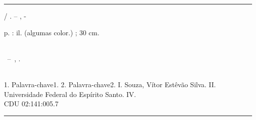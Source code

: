 \documentclass[
	12pt,				%
	openright,			%
	oneside,			%
	a4paper,			%
	english,			%
	french,				%
	spanish,			%
	brazil				%
	]{abntex2}
\begin{document}
\begin{fichacatalografica}
	\vspace*{\fill}
	\hrule
	\begin{center}
	\begin{minipage}[c]{12.5cm}
	
	\imprimirautor
	
	\hspace{0.5cm} \imprimirtitulo  / \imprimirautor. --
	\imprimirlocal, \imprimirdata-
	
	\hspace{0.5cm} \pageref{LastPage} p. : il. (algumas color.) ; 30 cm.\\
	
	\hspace{0.5cm} \imprimirorientadorRotulo~\imprimirorientador\\
	
	\hspace{0.5cm}
	\parbox[t]{\textwidth}{\imprimirtipotrabalho~--~\imprimirinstituicao,
	\imprimirdata.}\\
	
	\hspace{0.5cm}
		1. Palavra-chave1.
		2. Palavra-chave2.
		I. Souza, Vítor Estêvão Silva.
		II. Universidade Federal do Espírito Santo.
		IV. \imprimirtitulo \\ 			
	
	\hspace{8.75cm} CDU 02:141:005.7\\
	
	\end{minipage}
	\end{center}
	\hrule
\end{fichacatalografica}



% 
\end{document}
